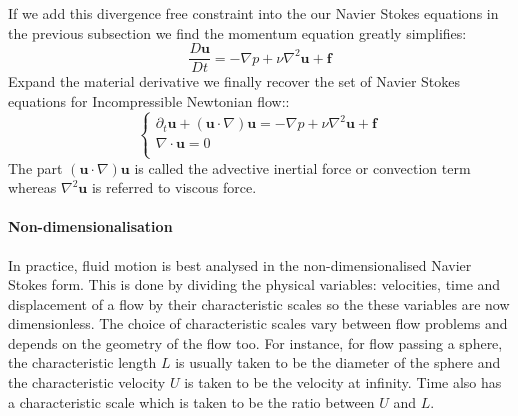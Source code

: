 If we add this divergence free constraint into the our Navier Stokes equations in the previous subsection we find the momentum equation greatly simplifies:
\begin{equation}
\dfrac{D\textbf{u}}{Dt} = -\nabla p + \nu \nabla^2\textbf{u} + \textbf{f}
\end{equation}
Expand the material derivative we finally recover the set of Navier Stokes equations for Incompressible Newtonian flow::
\begin{equation}
\begin{cases}
\partial_t\textbf{u} + (\textbf{u} \cdot \nabla)\textbf{u} = -\nabla p + \nu \nabla^2\textbf{u} + \textbf{f}\\
\nabla \cdot \textbf{u}=0\\
\end{cases}
\end{equation}
The part $(\textbf{u} \cdot \nabla)\textbf{u}$ is called the advective inertial force or convection term whereas $\nabla^2\textbf{u}$ is referred to viscous force.

\paragraph*{Non-dimensionalisation}
In practice, fluid motion is best analysed in the non-dimensionalised Navier Stokes form. This is done by dividing the physical variables: velocities, time and displacement of a flow by their characteristic scales so the these variables are now dimensionless. The choice of characteristic scales vary between flow problems and depends on the geometry of the flow too. For instance, for flow passing a sphere, the characteristic length $L$ is usually taken to be the diameter of the sphere and the characteristic velocity $U$ is taken to be the velocity at infinity. Time also has a characteristic scale which is taken to be the ratio between $U$ and $L$. \cite{chorin1990mathematical}\\

